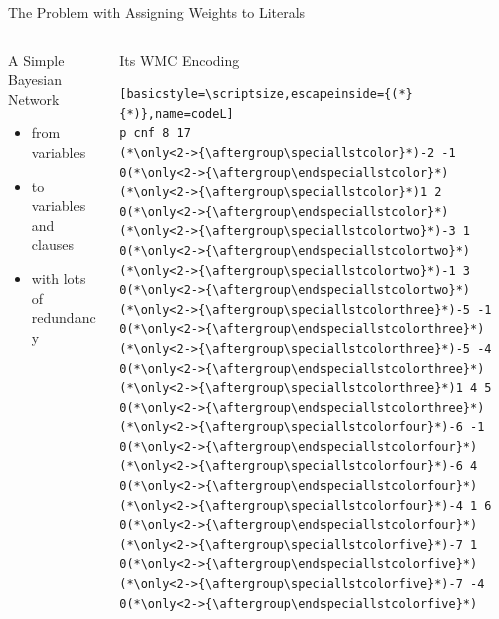 \documentclass{beamer}
\def\speciallstcolor{\begingroup\color{color1}}
\def\endspeciallstcolor{\endgroup}
\def\speciallstcolortwo{\begingroup\color{color2}}
\def\endspeciallstcolortwo{\endgroup}
\def\speciallstcolorthree{\begingroup\color{color3}}
\def\endspeciallstcolorthree{\endgroup}
\def\speciallstcolorfour{\begingroup\color{color4}}
\def\endspeciallstcolorfour{\endgroup}
\def\speciallstcolorfive{\begingroup\color{color5}}
\def\endspeciallstcolorfive{\endgroup}
\begin{document}
\begin{frame}[fragile]{The Problem with Assigning Weights to Literals}
  \begin{columns}[t]
    \begin{column}{0.5\textwidth}
      \begin{block}{A Simple Bayesian Network}
        \centering
      \end{block}
      \begin{itemize}
      \item from  variables
      \item to  variables and  clauses
      \item with lots of redundancy
      \end{itemize}
    \end{column}
    \begin{column}{0.5\textwidth}
      \begin{block}{Its WMC Encoding}
        \vspace{-0.2cm}
\begin{lstlisting}[basicstyle=\scriptsize,escapeinside={(*}{*)},name=codeL]
p cnf 8 17
(*\only<2->{\aftergroup\speciallstcolor}*)-2 -1 0(*\only<2->{\aftergroup\endspeciallstcolor}*)
(*\only<2->{\aftergroup\speciallstcolor}*)1 2 0(*\only<2->{\aftergroup\endspeciallstcolor}*)
(*\only<2->{\aftergroup\speciallstcolortwo}*)-3 1 0(*\only<2->{\aftergroup\endspeciallstcolortwo}*)
(*\only<2->{\aftergroup\speciallstcolortwo}*)-1 3 0(*\only<2->{\aftergroup\endspeciallstcolortwo}*)
(*\only<2->{\aftergroup\speciallstcolorthree}*)-5 -1 0(*\only<2->{\aftergroup\endspeciallstcolorthree}*)
(*\only<2->{\aftergroup\speciallstcolorthree}*)-5 -4 0(*\only<2->{\aftergroup\endspeciallstcolorthree}*)
(*\only<2->{\aftergroup\speciallstcolorthree}*)1 4 5 0(*\only<2->{\aftergroup\endspeciallstcolorthree}*)
(*\only<2->{\aftergroup\speciallstcolorfour}*)-6 -1 0(*\only<2->{\aftergroup\endspeciallstcolorfour}*)
(*\only<2->{\aftergroup\speciallstcolorfour}*)-6 4 0(*\only<2->{\aftergroup\endspeciallstcolorfour}*)
(*\only<2->{\aftergroup\speciallstcolorfour}*)-4 1 6 0(*\only<2->{\aftergroup\endspeciallstcolorfour}*)
(*\only<2->{\aftergroup\speciallstcolorfive}*)-7 1 0(*\only<2->{\aftergroup\endspeciallstcolorfive}*)
(*\only<2->{\aftergroup\speciallstcolorfive}*)-7 -4 0(*\only<2->{\aftergroup\endspeciallstcolorfive}*)

\end{lstlisting}
\end{block}
\end{column}
\end{columns}
\end{frame}
\end{document}
